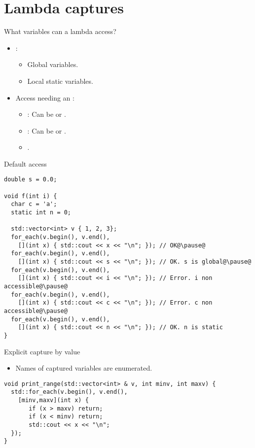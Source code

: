 \section{Lambda captures}

\begin{frame}[t,fragile]{What variables can a lambda access?}
  \begin{itemize}
    \item {}:
      \begin{itemize}
        \item Global variables.
        \item Local static variables.
      \end{itemize}
    \item Access needing an :
      \begin{itemize}
        \item {}: 
              Can be  or .
        \item {}: 
              Can be  or .
        \item {} .
      \end{itemize}
  \end{itemize}
\end{frame}

\begin{frame}[t,fragile]{Default access}
\begin{lstlisting}[escapechar=@]
double s = 0.0;

void f(int i) {
  char c = 'a';
  static int n = 0;

  std::vector<int> v { 1, 2, 3};
  for_each(v.begin(), v.end(),
    [](int x) { std::cout << x << "\n"; }); // OK@\pause@
  for_each(v.begin(), v.end(),
    [](int x) { std::cout << s << "\n"; }); // OK. s is global@\pause@
  for_each(v.begin(), v.end(),
    [](int x) { std::cout << i << "\n"; }); // Error. i non accessible@\pause@
  for_each(v.begin(), v.end(),
    [](int x) { std::cout << c << "\n"; }); // Error. c non accessible@\pause@
  for_each(v.begin(), v.end(),
    [](int x) { std::cout << n << "\n"; }); // OK. n is static
}
\end{lstlisting}
\end{frame}

\begin{frame}[t,fragile]{Explicit capture by value}
  \begin{itemize}
    \item Names of captured variables are enumerated.
  \end{itemize}
\pause
\begin{lstlisting}
void print_range(std::vector<int> & v, int minv, int maxv) {
  std::for_each(v.begin(), v.end(),
    [minv,maxv](int x) { 
       if (x > maxv) return;
       if (x < minv) return;
       std::cout << x << "\n";
  });
}
\end{lstlisting}
\end{frame}

